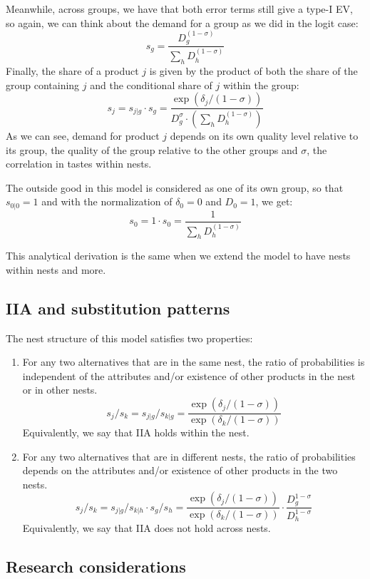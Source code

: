 Meanwhile, across groups, we have that both error terms still give a type-I EV, so again, we can think about the demand for a group as we did in the logit case: $$s_g = \frac{D_g^{(1-\sigma)}}{\sum_{h} D_h^{(1-\sigma)}} $$ Finally, the share of a product $j$ is given by the product of both the share of the group containing $j$ and the conditional share of $j$ within the group: $$s_j = s_{j\vert g} \cdot s_g = \frac{\exp(\delta_j/(1-\sigma))}{D_g^\sigma\cdot\left(\sum_{h} D_h^{(1-\sigma)}\right)} $$ As we can see, demand for product $j$ depends on its own quality level relative to its group, the quality of the group relative to the other groups and $\sigma$, the correlation in tastes within nests.

The outside good in this model is considered as one of its own group, so that $s_{0\vert 0} = 1$ and with the normalization of $\delta_0 = 0$ and $D_0 = 1$, we get:$$s_{0} = 1\cdot s_0 = \frac{1}{\sum_h D_h^{(1-\sigma)}} $$

This analytical derivation is the same when we extend the model to have nests within nests and more.

\subsection{IIA and substitution patterns}

The nest structure of this model satisfies two properties:\begin{enumerate}

\item For any two alternatives that are in the same nest, the ratio of probabilities is independent of the attributes and/or existence of other products in the nest or in other nests. $$ s_j / s_k = s_{j\vert g} / s_{k\vert g} = \frac{\exp(\delta_j/(1-\sigma))}{\exp(\delta_k/(1-\sigma))} $$ Equivalently, we say that IIA holds within the nest.

\item For any two alternatives that are in different nests, the ratio of probabilities depends on the attributes and/or existence of other products in the two nests. $$ s_j / s_k = s_{j\vert g} / s_{k\vert h} \cdot s_g / s_h  = \frac{\exp(\delta_j/(1-\sigma))}{\exp(\delta_k/(1-\sigma))} \cdot \frac{D_g^{1-\sigma}}{D_h^{1-\sigma}} $$ Equivalently, we say that IIA does not hold across nests.
\end{enumerate}

\subsection{Research considerations}

